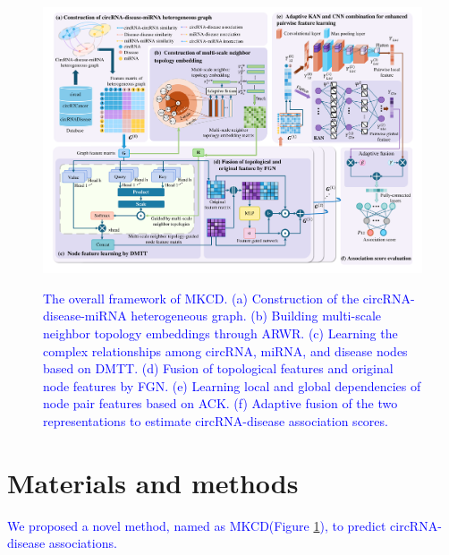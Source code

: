 \documentclass{bioinfo}
\begin{document}
\begin{methods}
\begin{figure}[t]
	\centering
	\includegraphics[width=8in]{fig/visio1.pdf}\\
	\vspace{0.2cm}
	\caption{\textcolor{blue}{The overall framework of MKCD. (a) Construction of the circRNA-disease-miRNA heterogeneous graph. (b) Building multi-scale neighbor topology embeddings through ARWR. (c) Learning the complex relationships among circRNA, miRNA, and disease nodes based on DMTT. (d) Fusion of topological features and original node features by FGN. (e) Learning local and global dependencies of node pair features based on ACK. (f) Adaptive fusion of the two representations to estimate circRNA-disease association scores.}}
	\label{fig:visio1}
	\vspace{0.1cm}
\end{figure}



\section{Materials and methods}
\textcolor{blue}{We proposed a novel method, named as MKCD(Figure \ref{fig:visio1}), to predict circRNA-disease associations.}



\end{methods}
\end{document}
